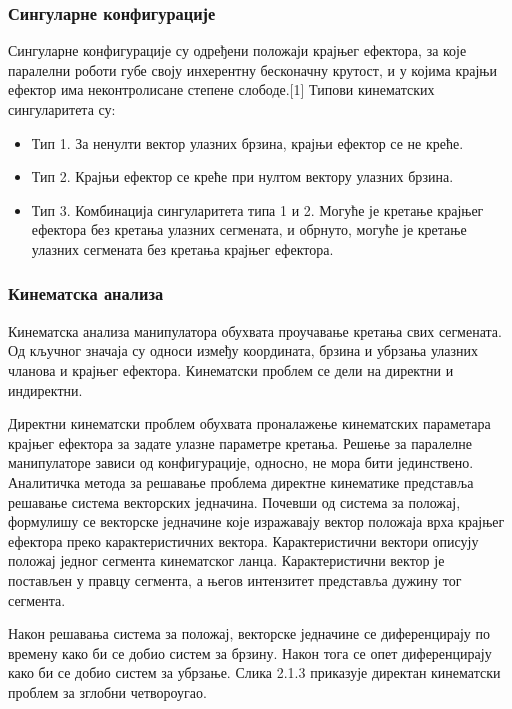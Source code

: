 \documentclass[12pt]{article}
\begin{document}
\subsubsection{Сингуларне конфигурације}
Сингуларне конфигурације су одређени положаји крајњег ефектора, за које паралелни роботи губе своју инхерентну бесконачну крутост, и у којима крајњи ефектор има неконтролисане степене слободе.[1] Типови кинематских сингуларитета су:
\begin{itemize}
    \item Тип 1. За ненулти вектор улазних брзина, крајњи ефектор се не креће.
    \item Тип 2. Крајњи ефектор се креће при нултом вектору улазних брзина.
    \item Тип 3. Комбинација сингуларитета типа 1 и 2. Могуће је кретање крајњег ефектора без кретања улазних сегмената, и обрнуто, могуће је кретање улазних сегмената без кретања крајњег ефектора.
\end{itemize}

\subsubsection{Кинематска анализа}
Кинематска анализа манипулатора обухвата проучавање кретања свих сегмената. Од кључног значаја су односи између координата, брзина и убрзања улазних чланова и крајњег ефектора. Кинематски проблем се дели на директни и индиректни.

Директни кинематски проблем обухвата проналажење кинематских параметара крајњег ефектора за задате улазне параметре кретања. Решење за паралелне манипулаторе зависи од конфигурације, односно, не мора бити јединствено. Аналитичка метода за решавање проблема директне кинематике представља решавање система векторских једначина. Почевши од система за положај, формулишу се векторске једначине које изражавају вектор положаја врха крајњег ефектора преко карактеристичних вектора. Карактеристични вектори описују положај једног сегмента кинематског ланца. Карактеристични вектор је постављен у правцу сегмента, а његов интензитет представља дужину тог сегмента.

Након решавања система за положај, векторске једначине се диференцирају по времену како би се добио систем за брзину. Након тога се опет диференцирају како би се добио систем за убрзање. Слика 2.1.3 приказује директан кинематски проблем за зглобни четвороугао.
\end{document}
